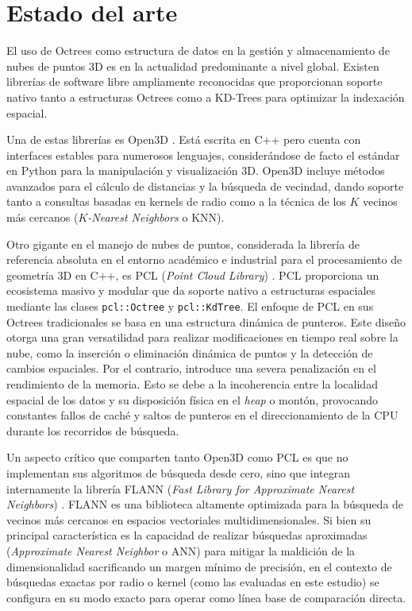 \chapter{Estado del arte}

El uso de Octrees como estructura de datos en la gestión y almacenamiento de nubes de puntos 3D es en la actualidad predominante a nivel global. Existen librerías de software libre ampliamente reconocidas que proporcionan soporte nativo tanto a estructuras Octrees como a KD-Trees para optimizar la indexación espacial.

Una de estas librerías es Open3D \cite{open3d_library}. Está escrita en C++ pero cuenta con interfaces estables para numerosos lenguajes, considerándose de facto el estándar en Python para la manipulación y visualización 3D. Open3D incluye métodos avanzados para el cálculo de distancias y la búsqueda de vecindad, dando soporte tanto a consultas basadas en kernels de radio como a la técnica de los $K$ vecinos más cercanos (\textit{$K$-Nearest Neighbors} o KNN).

Otro gigante en el manejo de nubes de puntos, considerada la librería de referencia absoluta en el entorno académico e industrial para el procesamiento de geometría 3D en C++, es PCL (\textit{Point Cloud Library}) \cite{pcl_pointclouds}. PCL proporciona un ecosistema masivo y modular que da soporte nativo a estructuras espaciales mediante las clases \texttt{pcl::Octree} y \texttt{pcl::KdTree}. El enfoque de PCL en sus Octrees tradicionales se basa en una estructura dinámica de punteros. Este diseño otorga una gran versatilidad para realizar modificaciones en tiempo real sobre la nube, como la inserción o eliminación dinámica de puntos y la detección de cambios espaciales. Por el contrario, introduce una severa penalización en el rendimiento de la memoria. Esto se debe a la incoherencia entre la localidad espacial de los datos y su disposición física en el \textit{heap} o montón, provocando constantes fallos de caché y saltos de punteros en el direccionamiento de la CPU durante los recorridos de búsqueda.

Un aspecto crítico que comparten tanto Open3D como PCL es que no implementan sus algoritmos de búsqueda desde cero, sino que integran internamente la librería FLANN (\textit{Fast Library for Approximate Nearest Neighbors}) \cite{flann}. FLANN es una biblioteca altamente optimizada para la búsqueda de vecinos más cercanos en espacios vectoriales multidimensionales. Si bien su principal característica es la capacidad de realizar búsquedas aproximadas (\textit{Approximate Nearest Neighbor} o ANN) para mitigar la maldición de la dimensionalidad sacrificando un margen mínimo de precisión, en el contexto de búsquedas exactas por radio o kernel (como las evaluadas en este estudio) se configura en su modo exacto para operar como línea base de comparación directa.

